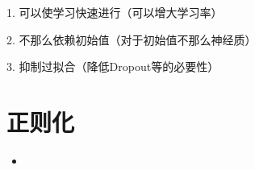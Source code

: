 \documentclass[letterpaper,10pt,english]{sphinxmanual}
\begin{document}
\begin{DUlineblock}{0em}
\item[] 
\item[] 1. 可以使学习快速进行（可以增大学习率）
\item[] 2. 不那么依赖初始值（对于初始值不那么神经质）
\item[] 3. 抑制过拟合（降低Dropout等的必要性）
\item[] 
\end{DUlineblock}


\section{正则化}
\label{\detokenize{_u4e0e_u5b66_u4e60_u76f8_u5173_u7684_u6280_u5de7:id4}}\begin{itemize}
\item {} 

\end{itemize}
\end{document}
